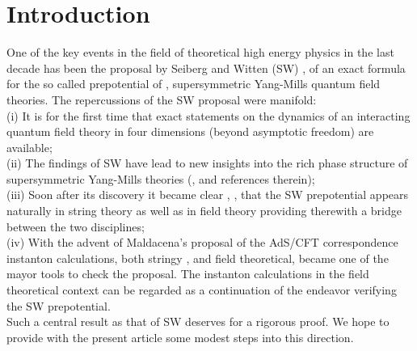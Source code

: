\documentclass[a4paper,12pt]{article}
\begin{document}
\section{Introduction}
One of the key events in the field of theoretical high energy 
physics in the last decade has been the proposal by Seiberg 
and Witten (SW) \cite{sw1}, \cite{sw2} of an exact formula for 
the so called prepotential of \coordHE{}, \coordHE{} supersymmetric 
Yang-Mills quantum field theories. The repercussions of the SW 
proposal were manifold: \\
(i) It is for the first time that exact statements on the dynamics 
of an interacting quantum field theory in four dimensions (beyond 
asymptotic freedom) are available; \\ 
(ii) The findings of SW have lead to new insights into the rich 
phase structure of supersymmetric Yang-Mills theories (\cite{s1}, 
\cite{abel} and references therein); \\
(iii) Soon after its discovery it became clear \cite{vafa}, 
\cite{lerche}, that the SW prepotential appears naturally in 
string theory as well as in field theory providing therewith a 
bridge between the two disciplines; \\
(iv) With the advent of Maldacena's proposal of the AdS/CFT 
correspondence \cite{maldacena} instanton calculations, both stringy 
\cite{green}, \cite{rossi} and field theoretical, \cite{dorey} 
became one of the mayor tools to check the proposal. 
The instanton calculations in the field theoretical context can 
be regarded as a continuation of the endeavor verifying the 
SW prepotential. \\ 
Such a central result as that of SW deserves for a rigorous proof. 
We hope to provide with the present article some modest steps into 
this direction. 
\end{document}
